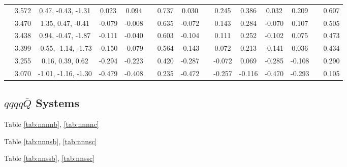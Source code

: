 \documentclass[prd,twocolumn,floatfix,nofootinbib]{revtex4}
\begin{document}
\begin{table*}[!htbp]
\begin{tabular}{c|cc|cccccccccccc}
                            &3.572  &0.47, -0.43, -1.31 &0.023 &0.094 & &0.737 &0.030 & &0.245 &0.386 &0.032 &0.209 & &0.607 \\
                            &3.470  &1.35, 0.47, -0.41 &-0.079 &-0.008 & &0.635 &-0.072 & &0.143 &0.284 &-0.070 &0.107 & &0.505 \\
                            &3.438  &0.94, -0.47, -1.87 &-0.111 &-0.040 & &0.603 &-0.104 & &0.111 &0.252 &-0.102 &0.075 & &0.473 \\
                            &3.399  &-0.55, -1.14, -1.73 &-0.150 &-0.079 & &0.564 &-0.143 & &0.072 &0.213 &-0.141 &0.036 & &0.434 \\
                            &3.255  &0.16, 0.39, 0.62 &-0.294 &-0.223 & &0.420 &-0.287 & &-0.072 &0.069 &-0.285 &-0.108 & &0.290 \\
                            &3.070  &-1.01, -1.16, -1.30 &-0.479 &-0.408 & &0.235 &-0.472 & &-0.257 &-0.116 &-0.470 &-0.293 & &0.105 \\
        \bottomrule[0.5pt]\bottomrule[1.5pt]
    \end{tabular}
\end{table*}


\subsection{$qqqq\bar{Q}$ Systems}
Table \ref{tab:nnnnb}, \ref{tab:nnnnc}

Table \ref{tab:nnnsb}, \ref{tab:nnnsc}

Table \ref{tab:nnssb}, \ref{tab:nnssc}
\end{document}

